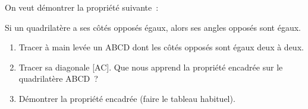 \documentclass[exercice]{thedocument}%
\begin{document}
%
On veut démontrer la propriété suivante~:\medskip\par\noindent
\begin{mdframed}
    Si un quadrilatère a ses côtés opposés égaux, alors ses
angles opposés sont égaux.
\end{mdframed}
\begin{enumerate}
    \item Tracer à main levée un ABCD dont les côtés opposés sont égaux deux
    à deux.
    \item Tracer sa diagonale [AC]. Que nous apprend la propriété encadrée sur
    le quadrilatère ABCD~?
    \item Démontrer la propriété encadrée (faire le tableau habituel).
\end{enumerate}
\end{document}
